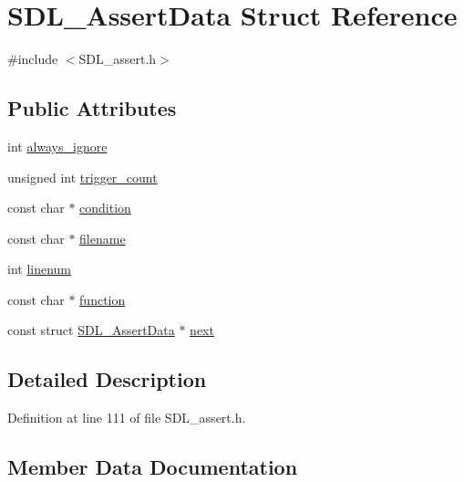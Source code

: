\hypertarget{struct_s_d_l___assert_data}{}\section{S\+D\+L\+\_\+\+Assert\+Data Struct Reference}
\label{struct_s_d_l___assert_data}


{\ttfamily \#include $<$S\+D\+L\+\_\+assert.\+h$>$}

\subsection*{Public Attributes}
\begin{DoxyCompactItemize}
\item 
int \mbox{\hyperlink{struct_s_d_l___assert_data_a825e1c7772fe24afad33d0afc42cf04c}{always\+\_\+ignore}}
\item 
unsigned int \mbox{\hyperlink{struct_s_d_l___assert_data_a230bbcc2d115aab04cf817773e08eb5b}{trigger\+\_\+count}}
\item 
const char $\ast$ \mbox{\hyperlink{struct_s_d_l___assert_data_aec6d372462fa8c94a9d04c1168cd38c9}{condition}}
\item 
const char $\ast$ \mbox{\hyperlink{struct_s_d_l___assert_data_acf27f593e6a436386d2cbcf826cf1ef7}{filename}}
\item 
int \mbox{\hyperlink{struct_s_d_l___assert_data_ad026d8573970d2402230d5fa3c550b0f}{linenum}}
\item 
const char $\ast$ \mbox{\hyperlink{struct_s_d_l___assert_data_a4913c57d4affb813feea82fc5f48a25c}{function}}
\item 
const struct \mbox{\hyperlink{struct_s_d_l___assert_data}{S\+D\+L\+\_\+\+Assert\+Data}} $\ast$ \mbox{\hyperlink{struct_s_d_l___assert_data_a2081dcf06dce4df497e423bccddfc099}{next}}
\end{DoxyCompactItemize}


\subsection{Detailed Description}


Definition at line 111 of file S\+D\+L\+\_\+assert.\+h.



\subsection{Member Data Documentation}
\mbox{\label{struct_s_d_l___assert_data_a825e1c7772fe24afad33d0afc42cf04c}} 
